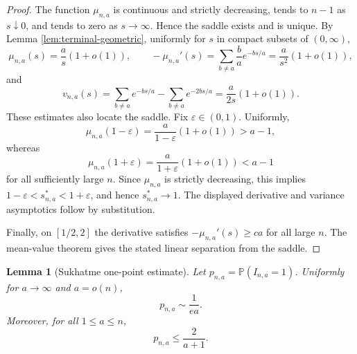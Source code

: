 \documentclass[11pt]{article}
\newtheorem{lemma}[theorem]{Lemma}
\theoremstyle{remark}
\newcommand{\Pp}{\mathbb P}
\begin{document}
\begin{proof}
The function \(\mu_{n,a}\) is continuous and strictly decreasing, tends to \(n-1\) as \(s\downarrow0\), and tends to zero as \(s\to\infty\).  Hence the saddle exists and is unique.  By Lemma \ref{lem:terminal-geometric}, uniformly for \(s\) in compact subsets of \((0,\infty)\),
\[
        \mu_{n,a}(s)=\frac{a}{s}(1+o(1)),
        \qquad
        -\mu_{n,a}'(s)=\sum_{b\ne a}\frac{b}{a}e^{-bs/a}=\frac{a}{s^2}(1+o(1)),
\]
and
\[
        v_{n,a}(s)
        =\sum_{b\ne a}e^{-bs/a}-\sum_{b\ne a}e^{-2bs/a}
        =\frac{a}{2s}(1+o(1)).
\]
These estimates also locate the saddle.  Fix \(\varepsilon\in(0,1)\).  Uniformly,
\[
        \mu_{n,a}(1-\varepsilon)
        =\frac{a}{1-\varepsilon}(1+o(1))>a-1,
\]
whereas
\[
        \mu_{n,a}(1+\varepsilon)
        =\frac{a}{1+\varepsilon}(1+o(1))<a-1
\]
for all sufficiently large \(n\).  Since \(\mu_{n,a}\) is strictly decreasing, this implies
\(1-\varepsilon<s_{n,a}^*<1+\varepsilon\), and hence \(s_{n,a}^*\to1\).  The displayed derivative and variance asymptotics follow by substitution.

Finally, on \([1/2,2]\) the derivative satisfies \(-\mu_{n,a}'(s)\ge c a\) for all large \(n\).  The mean-value theorem gives the stated linear separation from the saddle.
\end{proof}

\begin{lemma}[Sukhatme one-point estimate]\label{lem:suk-one}
Let \(p_{n,a}=\Pp(I_{n,a}=1)\).  Uniformly for \(a\to\infty\) and \(a=o(n)\),
\[
        p_{n,a}\sim \frac1{ea}.
\]
Moreover, for all \(1\le a\le n\),
\[
        p_{n,a}\le \frac{2}{a+1}.
\]
\end{lemma}
\end{document}
